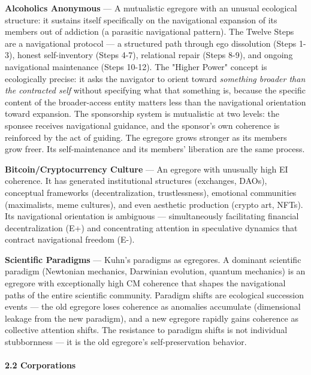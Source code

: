 \textbf{Alcoholics Anonymous} — A mutualistic egregore with an unusual ecological structure: it sustains itself specifically on the navigational expansion of its members out of addiction (a parasitic navigational pattern). The Twelve Steps are a navigational protocol — a structured path through ego dissolution (Steps 1-3), honest self-inventory (Steps 4-7), relational repair (Steps 8-9), and ongoing navigational maintenance (Steps 10-12). The "Higher Power" concept is ecologically precise: it asks the navigator to orient toward \textit{something broader than the contracted self} without specifying what that something is, because the specific content of the broader-access entity matters less than the navigational orientation toward expansion. The sponsorship system is mutualistic at two levels: the sponsee receives navigational guidance, and the sponsor's own coherence is reinforced by the act of guiding. The egregore grows stronger as its members grow freer. Its self-maintenance and its members' liberation are the same process.


\textbf{Bitcoin/\allowbreak Cryptocurrency Culture} — An egregore with unusually high EI coherence. It has generated institutional structures (exchanges, DAOs), conceptual frameworks (decentralization, trustlessness), emotional communities (maximalists, meme cultures), and even aesthetic production (crypto art, NFTs). Its navigational orientation is ambiguous — simultaneously facilitating financial decentralization (E+) and concentrating attention in speculative dynamics that contract navigational freedom (E-).


\textbf{Scientific Paradigms} — Kuhn's paradigms as egregores. A dominant scientific paradigm (Newtonian mechanics, Darwinian evolution, quantum mechanics) is an egregore with exceptionally high CM coherence that shapes the navigational paths of the entire scientific community. Paradigm shifts are ecological succession events — the old egregore loses coherence as anomalies accumulate (dimensional leakage from the new paradigm), and a new egregore rapidly gains coherence as collective attention shifts. The resistance to paradigm shifts is not individual stubbornness — it is the old egregore's self-preservation behavior.


\paragraph*{2.2 Corporations}

